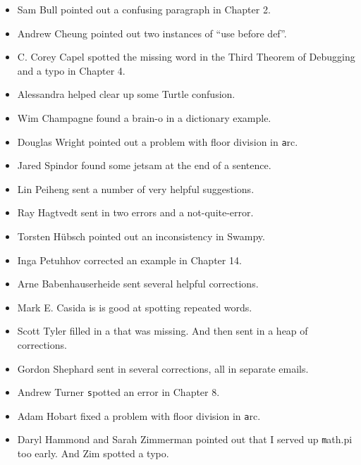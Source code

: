 \documentclass[
DIV=11,
fontsize=12,
twoside,
headinclude=false,
titlepage=firstiscover,
abstract=true,
headsepline=true,
footsepline=true,
chapterprefix=true, %
headings=big,
bibliography=totoc,%
captions=tableheading
]{scrbook}
\theoremstyle{definition}
\begin{document}
\begin{itemize}
\item Sam Bull pointed out a confusing paragraph in Chapter 2.

\item Andrew Cheung pointed out two instances of ``use before def''.

\item C. Corey Capel spotted the missing word in the Third Theorem
of Debugging and a typo in Chapter 4.

\item Alessandra helped clear up some Turtle confusion.

\item Wim Champagne found a brain-o in a dictionary example.

\item Douglas Wright pointed out a problem with floor division in
{\texttt arc}.

\item Jared Spindor found some jetsam at the end of a sentence.

\item Lin Peiheng sent a number of very helpful suggestions.

\item Ray Hagtvedt sent in two errors and a not-quite-error.

\item Torsten H\"{u}bsch pointed out an inconsistency in Swampy.

\item Inga Petuhhov corrected an example in Chapter 14.

\item Arne Babenhauserheide sent several helpful corrections.

\item Mark E. Casida is is good at spotting repeated words.

\item Scott Tyler filled in a that was missing.  And then sent in
a heap of corrections.

\item Gordon Shephard sent in several corrections, all in separate
emails.

\item Andrew Turner {\texttt spot}ted an error in Chapter 8.

\item Adam Hobart fixed a problem with floor division in {\texttt arc}.

\item Daryl Hammond and Sarah Zimmerman pointed out that I served
up {\texttt math.pi} too early.  And Zim spotted a typo.


\end{itemize}
\end{document}
